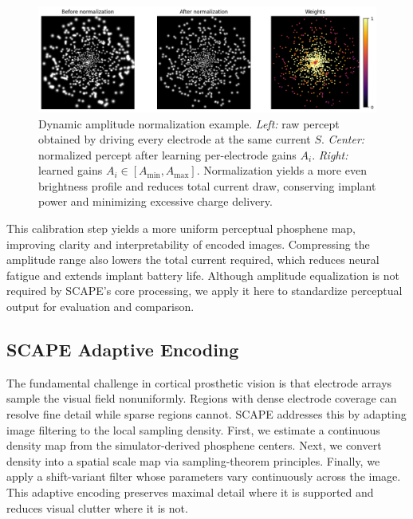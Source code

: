 \begin{figure}[ht]
  \centering
  \includegraphics[width=0.9\columnwidth]{figures/dynamicamplitudenorm.png}
  \caption{Dynamic amplitude normalization example.  
    \emph{Left:} raw percept obtained by driving every electrode at the same current \(S\).  
    \emph{Center:} normalized percept after learning per-electrode gains \(A_i\).  
    \emph{Right:} learned gains \(A_i\in[A_{\min},A_{\max}]\).  
    Normalization yields a more even brightness profile and reduces total current draw, conserving implant power and minimizing excessive charge delivery.}
  \label{fig:amplitude_norm}
\end{figure}

This calibration step yields a more uniform perceptual phosphene map, improving clarity and interpretability of encoded images. Compressing the amplitude range also lowers the total current required, which reduces neural fatigue and extends implant battery life. Although amplitude equalization is not required by SCAPE’s core processing, we apply it here to standardize perceptual output for evaluation and comparison.





\subsection{SCAPE Adaptive Encoding}

The fundamental challenge in cortical prosthetic vision is that electrode arrays sample the visual field nonuniformly. Regions with dense electrode coverage can resolve fine detail while sparse regions cannot. SCAPE addresses this by adapting image filtering to the local sampling density. First, we estimate a continuous density map from the simulator-derived phosphene centers. Next, we convert density into a spatial scale map via sampling-theorem principles. Finally, we apply a shift-variant filter whose parameters vary continuously across the image. This adaptive encoding preserves maximal detail where it is supported and reduces visual clutter where it is not.

